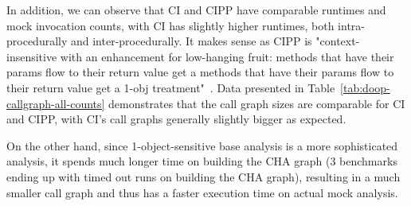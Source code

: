 In addition, we can observe that CI and CIPP have comparable runtimes and mock invocation counts, with CI has slightly higher runtimes, both intra-procedurally and inter-procedurally. It makes sense as CIPP is "context-insensitive with an enhancement for low-hanging fruit: methods that have their params flow to their return value get a methods that have their params flow to their return value get a 1-obj treatment"~\cite{yanniss}. Data presented in Table~\ref{tab:doop-callgraph-all-counts} demonstrates that the call graph sizes are comparable for CI and CIPP, with CI's call graphs generally slightly bigger as expected.

On the other hand, since 1-object-sensitive base analysis is a more sophisticated analysis, it spends much longer time on building the CHA graph (3 benchmarks ending up with timed out runs on building the CHA graph), resulting in a much smaller call graph and thus has a faster execution time on actual mock analysis. 



